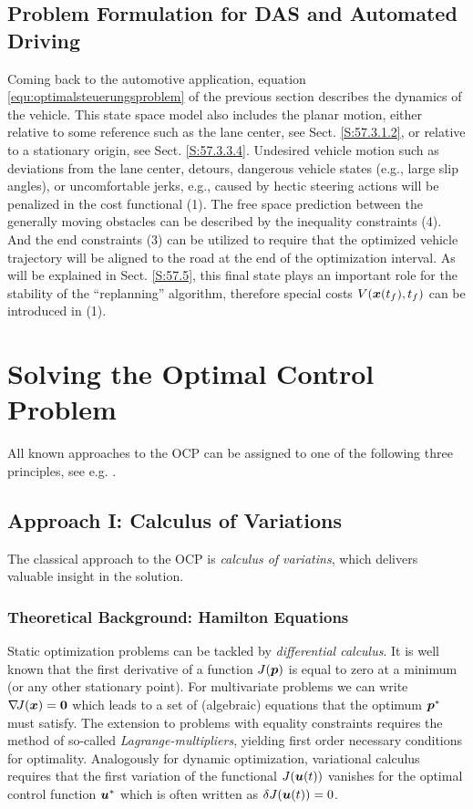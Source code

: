 \subsection{Problem Formulation for DAS and Automated Driving}\label{S:57.2.2}
Coming back to the automotive application, equation \eqref{equ:optimalsteuerungsproblem} of the previous section describes the dynamics of the vehicle. This state space model also includes the planar motion, either relative to some reference such as the lane center, see Sect. \ref{S:57.3.1.2}, or relative to a stationary origin, see Sect. \ref{S:57.3.3.4}. Undesired vehicle motion such as deviations from the lane center, detours, dangerous vehicle states (e.g., large slip angles), or uncomfortable jerks, e.g., caused by hectic steering actions will be penalized in the cost functional (1). The free space prediction between the generally moving obstacles can be described by the inequality constraints (4). And the end constraints (3) can be utilized to require that the optimized vehicle trajectory will be aligned to the road at the end of the optimization interval. As will be explained in Sect. \ref{S:57.5}, this final state plays an important role for the stability of the “replanning” algorithm, therefore special costs 
$V(\boldsymbol{x}(t_f), t_f)$ can be introduced in (1). 

\section{Solving the Optimal Control Problem}\label{S:57.3}
All known approaches to the OCP can be assigned to one of the following three principles, see e.g. \cite{diehl_fast_multipleshooting}.
\subsection{Approach I: Calculus of Variations}\label{S:57.3.1}
The classical approach to the OCP is \textit{calculus of variatins}, which delivers valuable insight in the solution. 

\subsubsection{Theoretical Background: Hamilton Equations}\label{S:57.3.1.1}

Static optimization problems can be tackled by \textit{differential calculus}. It is well known that the first derivative of a function $J(\boldsymbol{p})$  is equal to zero at a minimum (or any other stationary point). For multivariate problems we can write $\nabla\!J(\boldsymbol{x}) = \boldsymbol{0}$
which leads to a set of (algebraic) equations that the optimum 
$\boldsymbol{p}^\ast$ must satisfy. The extension to problems with equality constraints requires the method of so-called \textit{Lagrange-multipliers}, yielding first order necessary conditions for optimality.
Analogously for dynamic optimization, variational calculus requires that the first variation of the functional $J(\boldsymbol{u}(t))$
vanishes for the optimal control function $\boldsymbol{u}^\ast$
which is often written as $\delta J(\boldsymbol{u}(t))=0$. 


